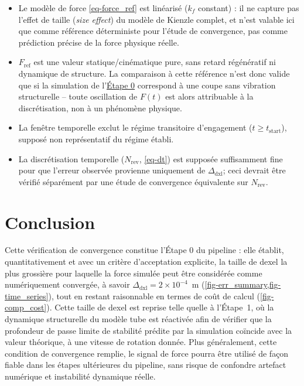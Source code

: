 \documentclass[
    11pt,
    a4paper
]{article}
\newcommand{\kf}{k_f}
\newcommand{\Fref}{F_{\mathrm{ref}}}
\newcommand{\dxlsize}{\Delta_{\mathrm{dxl}}}
\begin{document}
\begin{itemize}
    \item Le modèle de force \cref{eq-force_ref} est linéarisé (\(\kf\) constant) : il ne
        capture pas l'effet de taille (\emph{size effect}) du modèle de Kienzle complet,
        et n'est valable ici que comme référence déterministe pour l'étude de
        convergence, pas comme prédiction précise de la force physique réelle.
    \item \(\Fref\) est une valeur statique/cinématique pure, sans retard régénératif ni
        dynamique de structure. La comparaison à cette référence n'est donc valide que si
        la simulation de l'{}\hyperref[sec-procedure]{Étape 0} correspond à une coupe sans
        vibration structurelle -- toute oscillation de \(F(t)\) est alors attribuable à la
        discrétisation, non à un phénomène physique.
    \item La fenêtre temporelle exclut le régime transitoire d'engagement
        (\(t \geq t_{\mathrm{start}}\)), supposé non représentatif du régime établi.
    \item La discrétisation temporelle (\(N_{\mathrm{rev}}\), \cref{eq-dt}) est supposée
        suffisamment fine pour que l'erreur observée provienne uniquement de
        \(\dxlsize\); ceci devrait être vérifié séparément par une étude de convergence
        équivalente sur \(N_{\mathrm{rev}}\).
\end{itemize}

\section{Conclusion}
\label{sec-conclusion}

Cette vérification de convergence constitue l'Étape 0 du pipeline : elle établit,
quantitativement et avec un critère d'acceptation explicite, la taille de dexel la plus
grossière pour laquelle la force simulée peut être considérée comme numériquement
convergée, à savoir \(\dxlsize = 2\times10^{-4}\)~m (\cref{fig-err_summary,fig-time_series}),
tout en restant raisonnable en termes de coût de calcul (\cref{fig-comp_cost}). Cette
taille de dexel est reprise telle quelle à l'Étape~1, où la dynamique structurelle du
modèle tube est réactivée afin de vérifier que la profondeur de passe limite de stabilité
prédite par la simulation coïncide avec la valeur théorique, à une vitesse de rotation
donnée. Plus généralement, cette condition de convergence remplie, le signal de force
pourra être utilisé de façon fiable dans les étapes ultérieures du pipeline, sans risque de
confondre artefact numérique et instabilité dynamique réelle.

\end{document}
